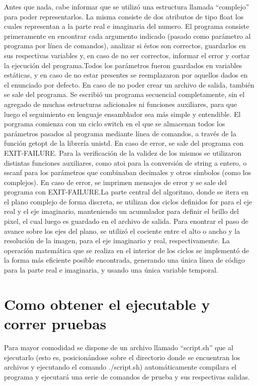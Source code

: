 \documentclass[a4paper,10pt]{article}
\begin{document}
Antes que nada, cabe informar que se utilizó una estructura llamada “complejo” para poder representarlos. La misma consiste de dos atributos de tipo float los cuales representan a la parte real e imaginaria del numero. El programa consiste primeramente en encontrar cada argumento indicado (pasado como parámetro al programa por línea de comandos), analizar si éstos son correctos, guardarlos en sus respectivas variables y, en caso de no ser correctos, informar el error y cortar la ejecución del programa.Todos los parámetros fueron guardados en variables estáticas, y en caso de no estar presentes se reemplazaron por aquellos dados en el enunciado por defecto. En caso de no poder crear un archivo de salida, también se sale del programa. Se escribió un programa secuencial completamente, sin el agregado de muchas estructuras adicionales ni funciones auxiliares, para que luego el seguimiento en lenguaje ensamblador sea más simple y entendible. El porgrama comienza con un ciclo switch en el que se almacenan todos los parámetros pasados al programa mediante línea de comandos, a través de la función getopt de la librería unistd. En caso de error, se sale del programa con EXIT-FAILURE. Para la verificación de la validez de los mismos se utilizaron distintas funciones auxiliares, como atoi para la conversión de string a entero, o sscanf para los parámetros que combinaban decimales y otros símbolos (como los complejos). En caso de error, se imprimen mensajes de error y se sale del programa con EXIT-FAILURE.La parte central del algoritmo, donde se itera en el plano complejo de forma discreta, se utilizan dos ciclos definidos for para el eje real y el eje imaginario, manteniendo un acumulador para definir el brillo del pixel, el cual luego es guardado en el archivo de salida. Para enontrar el paso de avance sobre los ejes del plano, se utilizó el cociente entre el alto o ancho y la resolución de la imagen, para el eje imaginario y real, respectivamente. La operación matemática que se realiza en el interior de los ciclos se implementó de la forma más eficiente posible encontrada, generando una única línea de código para la parte real e imaginaria, y usando una única variable temporal.

\section{Como obtener el ejecutable y correr pruebas}

Para mayor comodidad se dispone de un archivo llamado “script.sh” que al ejecutarlo (esto es, posicionándose sobre el directorio donde se encuentran los archivos y ejecutando el comando ./script.sh) automáticamente compilara el programa y ejecutará una serie de comandos de prueba y sus respectivas salidas.
\end{document}
